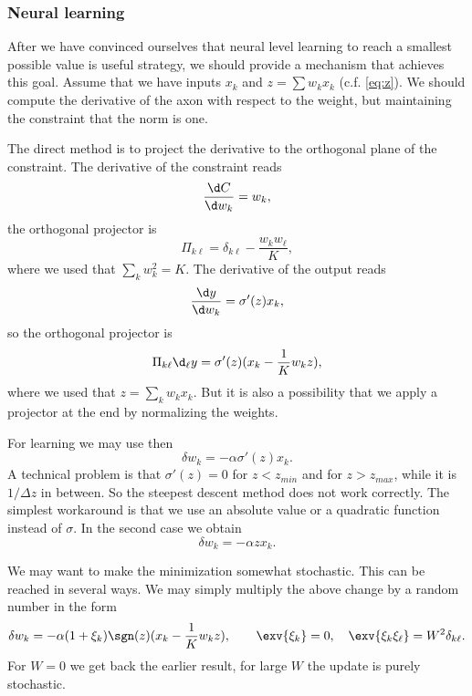 \documentclass[10pt,a4paper]{article}
\begin{document}
\subsubsection{Neural learning}

After we have convinced ourselves that neural level learning to reach a smallest possible value is useful strategy, we should provide a mechanism that achieves this goal. Assume that we have inputs $x_k$ and $z=\sum w_kx_k$ (c.f. \eqref{eq:z}). We should compute the derivative of the axon with respect to the weight, but maintaining the constraint that the norm is one.

The direct method is to project the derivative to the orthogonal plane of the constraint. The derivative of the constraint reads
\begin{equation}
  \frac{\d C}{\d w_k} = w_k,
\end{equation}
the orthogonal projector is
\begin{equation}
  \Pi_{k\ell}= \delta_{k\ell}-\frac{w_kw_\ell}K,
\end{equation}
where we used that $\sum_kw_k^2=K$. The derivative of the output reads
\begin{equation}
  \frac{\d y}{\d w_k} = \sigma'(z) x_k,
\end{equation}
so the orthogonal projector is
\begin{equation}
  \Pi_{k\ell}\d_\ell y= \sigma'(z)(x_k - \frac1K w_k z),
\end{equation}
where we used that $z=\sum_kw_kx_k$. But it is also a possibility that we apply a projector at the end by normalizing the weights.

For learning we may use then
\begin{equation}
  \delta w_k = -\alpha \sigma'(z) x_k.
\end{equation}
A technical problem is that $\sigma'(z)=0$ for $z<z_{min}$ and for $z>z_{max}$, while it is $1/\Delta z$ in between. So the steepest descent method does not work correctly. The simplest workaround is that we use an absolute value or a quadratic function instead of $\sigma$. In the second case we obtain
\begin{equation}
  \delta w_k = -\alpha z x_k.
\end{equation}

We may want to make the minimization somewhat stochastic. This can be reached in several ways. We may simply multiply the above change by a random number in the form
\begin{equation}
  \delta w_k = -\alpha(1+\xi_k) \sgn(z)(x_k - \frac1K w_k z),\qquad \exv{\xi_k}=0,\quad \exv{\xi_k\xi_\ell}=W^2\delta_{k\ell}.
\end{equation}
For $W=0$ we get back the earlier result, for large $W$ the update is purely stochastic.
\end{document}
